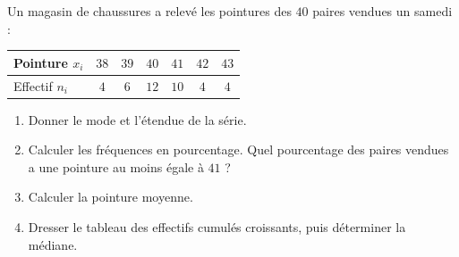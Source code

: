 
\newcommand{\R}{\mathbb{R}}
\newcommand{\vect}[1]{\overrightarrow{#1}}

Un magasin de chaussures a relevé les pointures des $40$ paires vendues un samedi :
\begin{center}
\begin{tabular}{|l|c|c|c|c|c|c|}\hline
Pointure $x_i$ & $38$ & $39$ & $40$ & $41$ & $42$ & $43$ \\\hline
Effectif $n_i$ & $4$ & $6$ & $12$ & $10$ & $4$ & $4$ \\\hline
\end{tabular}\end{center}
\begin{enumerate}
  \item Donner le mode et l'étendue de la série.
  \item Calculer les fréquences en pourcentage. Quel pourcentage des paires vendues a une pointure au moins égale à $41$ ?
  \item Calculer la pointure moyenne.
  \item Dresser le tableau des effectifs cumulés croissants, puis déterminer la médiane.
\end{enumerate}

